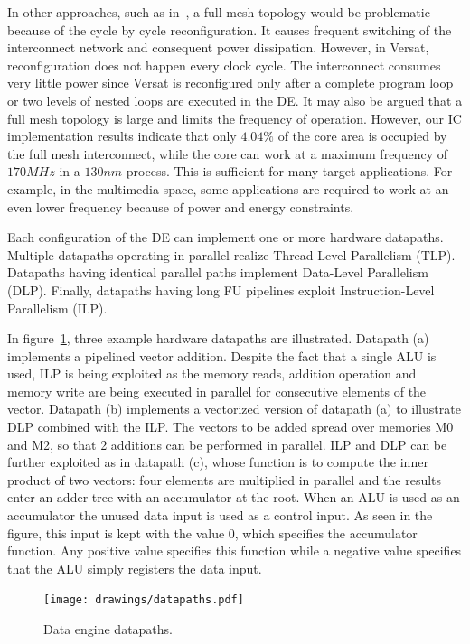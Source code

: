 In other approaches, such as in~\cite{Mei05}, a full mesh topology
would be problematic because of the cycle by cycle reconfiguration. It
causes frequent switching of the interconnect network and consequent
power dissipation. However, in Versat, reconfiguration does not happen
every clock cycle. The interconnect consumes very little power since
Versat is reconfigured only after a complete program loop or two
levels of nested loops are executed in the DE. It may also be argued
that a full mesh topology is large and limits the frequency of
operation. However, our IC implementation results indicate that only
$4.04\%$ of the core area is occupied by the full mesh interconnect,
while the core can work at a maximum frequency of $170MHz$ in a
$130nm$ process. This is sufficient for many target applications. For
example, in the multimedia space, some applications are required to
work at an even lower frequency because of power and energy
constraints.

Each configuration of the DE can implement one or more hardware
datapaths. Multiple datapaths operating in parallel realize
Thread-Level Parallelism (TLP). Datapaths having identical parallel
paths implement Data-Level Parallelism (DLP). Finally, datapaths
having long FU pipelines exploit Instruction-Level Parallelism (ILP).

In figure~\ref{fig_de_dp}, three example hardware datapaths are
illustrated. Datapath (a) implements a pipelined vector
addition. Despite the fact that a single ALU is used, ILP is being
exploited as the memory reads, addition operation and memory write are
being executed in parallel for consecutive elements of the
vector. Datapath (b) implements a vectorized version of datapath (a)
to illustrate DLP combined with the ILP. The vectors to be added
spread over memories M0 and M2, so that 2 additions can be performed
in parallel. ILP and DLP can be further exploited as in datapath (c),
whose function is to compute the inner product of two vectors: four
elements are multiplied in parallel and the results enter an adder
tree with an accumulator at the root. When an ALU is used as an
accumulator the unused data input is used as a control input. As seen
in the figure, this input is kept with the value 0, which specifies
the accumulator function. Any positive value specifies this function
while a negative value specifies that the ALU simply registers the
data input.

\begin{figure}[!htb]
\centering
\texttt{[image: drawings/datapaths.pdf]}
\caption{Data engine datapaths.}
\label{fig_de_dp}
\end{figure}


